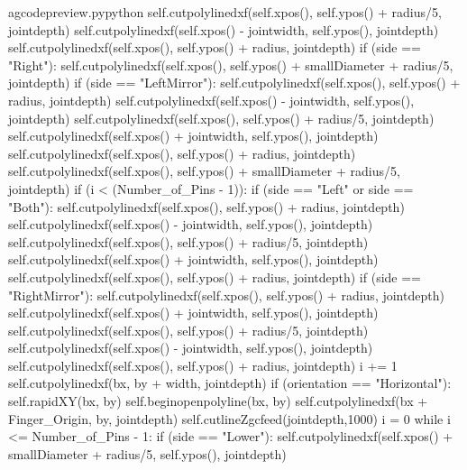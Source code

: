 \documentclass{ltxdoc}
\begin{document}
\begin{writecode}{a}{gcodepreview.py}{python}
                    self.cutpolylinedxf(self.xpos(), self.ypos() + radius/5, jointdepth)
                    self.cutpolylinedxf(self.xpos() - jointwidth, self.ypos(), jointdepth)
                    self.cutpolylinedxf(self.xpos(), self.ypos() + radius, jointdepth)
                if (side == "Right"):
                    self.cutpolylinedxf(self.xpos(), self.ypos() + smallDiameter + radius/5, jointdepth)
                if (side == "LeftMirror"):
                    self.cutpolylinedxf(self.xpos(), self.ypos() + radius, jointdepth)
                    self.cutpolylinedxf(self.xpos() - jointwidth, self.ypos(), jointdepth)
                    self.cutpolylinedxf(self.xpos(), self.ypos() + radius/5, jointdepth)
                    self.cutpolylinedxf(self.xpos() + jointwidth, self.ypos(), jointdepth)
                    self.cutpolylinedxf(self.xpos(), self.ypos() + radius, jointdepth)
                    self.cutpolylinedxf(self.xpos(), self.ypos() + smallDiameter + radius/5, jointdepth)
                if (i < (Number_of_Pins - 1)):
                    if (side == "Left" or side == "Both"):
                        self.cutpolylinedxf(self.xpos(), self.ypos() + radius, jointdepth)
                        self.cutpolylinedxf(self.xpos() - jointwidth, self.ypos(), jointdepth)
                        self.cutpolylinedxf(self.xpos(), self.ypos() + radius/5, jointdepth)
                        self.cutpolylinedxf(self.xpos() + jointwidth, self.ypos(), jointdepth)
                        self.cutpolylinedxf(self.xpos(), self.ypos() + radius, jointdepth)
                    if (side == "RightMirror"):
                        self.cutpolylinedxf(self.xpos(), self.ypos() + radius, jointdepth)
                        self.cutpolylinedxf(self.xpos() + jointwidth, self.ypos(), jointdepth)
                        self.cutpolylinedxf(self.xpos(), self.ypos() + radius/5, jointdepth)
                        self.cutpolylinedxf(self.xpos() - jointwidth, self.ypos(), jointdepth)
                        self.cutpolylinedxf(self.xpos(), self.ypos() + radius, jointdepth)
                i += 1
            self.cutpolylinedxf(bx, by + width, jointdepth)
        if (orientation == "Horizontal"):
            self.rapidXY(bx, by)
            self.beginopenpolyline(bx, by)
            self.cutpolylinedxf(bx + Finger_Origin, by, jointdepth)
            self.cutlineZgcfeed(jointdepth,1000)
            i = 0
            while i <= Number_of_Pins - 1:
                if (side == "Lower"):
                    self.cutpolylinedxf(self.xpos() + smallDiameter + radius/5, self.ypos(), jointdepth)

\end{writecode}
\end{document}
